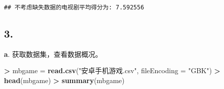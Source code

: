 \documentclass[
]{article}
\newenvironment{Shaded}{\begin{snugshade}}{\end{snugshade}}
\newcommand{\AttributeTok}[1]{\textcolor[rgb]{0.13,0.29,0.53}{#1}}
\newcommand{\FunctionTok}[1]{\textcolor[rgb]{0.13,0.29,0.53}{\textbf{#1}}}
\newcommand{\NormalTok}[1]{#1}
\newcommand{\OtherTok}[1]{\textcolor[rgb]{0.56,0.35,0.01}{#1}}
\newcommand{\SpecialCharTok}[1]{\textcolor[rgb]{0.81,0.36,0.00}{\textbf{#1}}}
\newcommand{\StringTok}[1]{\textcolor[rgb]{0.31,0.60,0.02}{#1}}
\begin{document}
\begin{verbatim}
## 不考虑缺失数据的电视剧平均得分为: 7.592556
\end{verbatim}

\subsection{3.}\label{section-2}

\textbf{a}. 获取数据集，查看数据概况。

\begin{Shaded}
\begin{Highlighting}[]
\SpecialCharTok{\textgreater{}}\NormalTok{ mbgame }\OtherTok{=} \FunctionTok{read.csv}\NormalTok{(}\StringTok{"安卓手机游戏.csv"}\NormalTok{, }\AttributeTok{fileEncoding =} \StringTok{"GBK"}\NormalTok{)}
\SpecialCharTok{\textgreater{}} \FunctionTok{head}\NormalTok{(mbgame)}
\SpecialCharTok{\textgreater{}} \FunctionTok{summary}\NormalTok{(mbgame)}
\end{Highlighting}
\end{Shaded}
\end{document}
